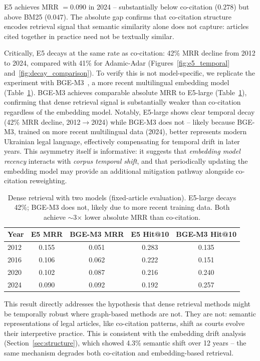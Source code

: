 \documentclass[11pt]{article}
\begin{document}
E5 achieves MRR $= 0.090$ in 2024 -- substantially below co-citation ($0.278$) but above BM25 ($0.047$).
The absolute gap confirms that co-citation structure encodes retrieval signal that semantic similarity alone does not capture: articles cited together in practice need not be textually similar.

Critically, E5 decays at the same rate as co-citation: 42\% MRR decline from 2012 to 2024, compared with 41\% for Adamic-Adar (Figures~\ref{fig:e5_temporal} and~\ref{fig:decay_comparison}).
To verify this is not model-specific, we replicate the experiment with BGE-M3~\citep{chen2024bge}, a more recent multilingual embedding model (Table~\ref{tab:bge}).
BGE-M3 achieves comparable absolute MRR to E5-large (Table~\ref{tab:bge}), confirming that dense retrieval signal is substantially weaker than co-citation regardless of the embedding model.
Notably, E5-large shows clear temporal decay (42\% MRR decline, 2012$\to$2024) while BGE-M3 does not -- likely because BGE-M3, trained on more recent multilingual data (2024), better represents modern Ukrainian legal language, effectively compensating for temporal drift in later years.
This asymmetry itself is informative: it suggests that \emph{embedding model recency} interacts with \emph{corpus temporal shift}, and that periodically updating the embedding model may provide an additional mitigation pathway alongside co-citation reweighting.

\begin{table}[t]
\centering
\small
\caption{Dense retrieval with two models (fixed-article evaluation). E5-large decays 42\%; BGE-M3 does not, likely due to more recent training data. Both achieve $\sim$3$\times$ lower absolute MRR than co-citation.}
\label{tab:bge}
\begin{tabular}{@{}l cc cc@{}}
\toprule
\textbf{Year} & \textbf{E5 MRR} & \textbf{BGE-M3 MRR} & \textbf{E5 Hit@10} & \textbf{BGE-M3 Hit@10} \\
\midrule
2012 & 0.155 & 0.051 & 0.283 & 0.135 \\
2016 & 0.106 & 0.062 & 0.222 & 0.151 \\
2020 & 0.102 & 0.087 & 0.216 & 0.240 \\
2024 & 0.090 & 0.092 & 0.192 & 0.257 \\
\bottomrule
\end{tabular}
\end{table}

This result directly addresses the hypothesis that dense retrieval methods might be temporally robust where graph-based methods are not.
They are not: semantic representations of legal articles, like co-citation patterns, shift as courts evolve their interpretive practice.
This is consistent with the embedding drift analysis (Section~\ref{sec:structure}), which showed 4.3\% semantic shift over 12 years -- the same mechanism degrades both co-citation and embedding-based retrieval.
\end{document}
